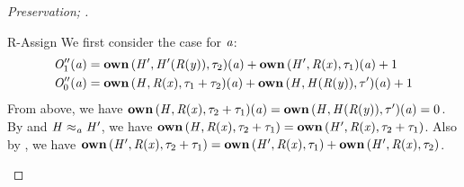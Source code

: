 \begin{proof}[Preservation; ]
\begin{rneqncase}{R-Assign}
    We first consider the case for $\mathit{a}$:
    \begin{align*}
      \mathit{O''_{{\mathrm{1}}}}  (  \mathit{a}  ) & = \mathbf{own} \, (  \mathit{H'}  ,  \mathit{H'}  (  \mathit{R}  (  \mathit{y}  )  )  ,  \tau_{{\mathrm{2}}}  )  (  \mathit{a}  )  +  \mathbf{own} \, (  \mathit{H'}  ,  \mathit{R}  (  \mathit{x}  )  ,  \tau_{{\mathrm{1}}}  )  (  \mathit{a}  )  +  1 \\
      \mathit{O''_{{\mathrm{0}}}}  (  \mathit{a}  ) & = \mathbf{own} \, (  \mathit{H}  ,  \mathit{R}  (  \mathit{x}  )  ,  \tau_{{\mathrm{1}}}  +  \tau_{{\mathrm{2}}}  )  (  \mathit{a}  )  +  \mathbf{own} \, (  \mathit{H}  ,  \mathit{H}  (  \mathit{R}  (  \mathit{y}  )  )  ,  \tau'  )  (  \mathit{a}  )  +  1
    \end{align*}
    From above, we have $\mathbf{own} \, (  \mathit{H}  ,  \mathit{R}  (  \mathit{x}  )  ,  \tau_{{\mathrm{2}}}  +  \tau_{{\mathrm{1}}}  )  (  \mathit{a}  )  =  \mathbf{own} \, (  \mathit{H}  ,  \mathit{H}  (  \mathit{R}  (  \mathit{y}  )  )  ,  \tau'  )  (  \mathit{a}  )  =  0$.
    By  and $ \mathit{H}   \approx _ {\mathit{a}}   \mathit{H'} $, we have $\mathbf{own} \, (  \mathit{H}  ,  \mathit{R}  (  \mathit{x}  )  ,  \tau_{{\mathrm{2}}}  +  \tau_{{\mathrm{1}}}  )  =  \mathbf{own} \, (  \mathit{H'}  ,  \mathit{R}  (  \mathit{x}  )  ,  \tau_{{\mathrm{2}}}  +  \tau_{{\mathrm{1}}}  )$.
    Also by , we have $\mathbf{own} \, (  \mathit{H'}  ,  \mathit{R}  (  \mathit{x}  )  ,  \tau_{{\mathrm{2}}}  +  \tau_{{\mathrm{1}}}  )  =  \mathbf{own} \, (  \mathit{H'}  ,  \mathit{R}  (  \mathit{x}  )  ,  \tau_{{\mathrm{1}}}  )  +  \mathbf{own} \, (  \mathit{H'}  ,  \mathit{R}  (  \mathit{x}  )  ,  \tau_{{\mathrm{2}}}  )$.

\end{rneqncase}
\end{proof}

